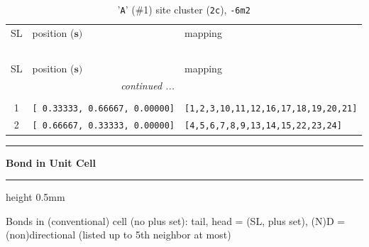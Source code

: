 \documentclass[fleqn,10pt,landscape]{jsarticle}
\begin{document}
\renewcommand{\arraystretch}{1.6}
\begin{longtable}[l]{cll}
\captionsetup{justification=raggedright, singlelinecheck=off}
\caption{'\texttt{A}' (\#1) site cluster (\texttt{2c}), \texttt{-6m2}}
 \\
 \hline \hline
SL & position ($\bm{s})$ & mapping \\ \hline \endfirsthead

\multicolumn{2}{l}{\tablename\ \thetable{}} \\
 \hline \hline
SL & position ($\bm{s})$ & mapping \\ \hline \endhead

 \hline \hline
\multicolumn{2}{r}{\footnotesize\it continued ...} \\ \endfoot

 \hline \hline
\multicolumn{2}{r}{} \\ \endlastfoot

1 & \texttt{[ 0.33333, 0.66667, 0.00000]} & \texttt{[1,2,3,10,11,12,16,17,18,19,20,21]} \\ \hline
2 & \texttt{[ 0.66667, 0.33333, 0.00000]} & \texttt{[4,5,6,7,8,9,13,14,15,22,23,24]} \\
\end{longtable}
\vspace{5mm}
\noindent \rule[0.5mm]{5mm}{0.5mm}\hspace{3mm}\textbf{Bond in Unit Cell}\hspace{3mm}\leaders\hrule height 0.5mm\hfill\kern0pt
\vspace{3mm}

\noindent Bonds in (conventional) cell (no plus set): tail, head = (SL, plus set), (N)D = (non)directional (listed up to 5th neighbor at most)
\end{document}

